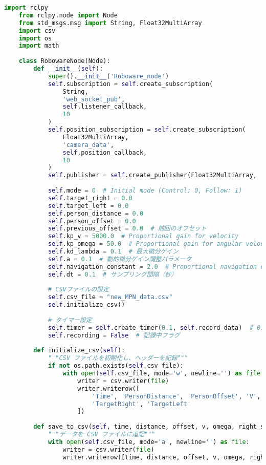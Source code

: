 \begin{lstlisting}[language=Python, caption=Roboware\_node.py]
    import rclpy
    from rclpy.node import Node
    from std_msgs.msg import String, Float32MultiArray
    import csv
    import os
    import math
    
    class RobowareNode(Node):
        def __init__(self):
            super().__init__('Roboware_node')
            self.subscription = self.create_subscription(
                String,
                'web_socket_pub',
                self.listener_callback,
                10
            )
            self.position_subscription = self.create_subscription(
                Float32MultiArray,
                'camera_data',
                self.position_callback,
                10
            )
            self.publisher = self.create_publisher(Float32MultiArray, 'wheel_targets', 10)
    
            self.mode = 0  # Initial mode (Control: 0, Follow: 1)
            self.target_right = 0.0
            self.target_left = 0.0
            self.person_distance = 0.0
            self.person_offset = 0.0
            self.previous_offset = 0.0  # 前回のオフセット
            self.kp_v = 5000.0  # Proportional gain for velocity
            self.kp_omega = 50.0  # Proportional gain for angular velocity
            self.kd_lambda = 0.1  # 最大微分ゲイン
            self.a = 0.1  # 動的微分ゲイン調整パラメータ
            self.navigation_constant = 2.0  # Proportional navigation constant (N)
            self.dt = 0.1  # サンプリング間隔（秒）
    
            # CSVファイルの設定
            self.csv_file = "new_MPN_data.csv"
            self.initialize_csv()
    
            # タイマー設定
            self.timer = self.create_timer(0.1, self.record_data)  # 0.1 秒ごとに実行
            self.recording = False  # 記録中フラグ
    
        def initialize_csv(self):
            """CSV ファイルを初期化し、ヘッダーを記録"""
            if not os.path.exists(self.csv_file):
                with open(self.csv_file, mode='w', newline='') as file:
                    writer = csv.writer(file)
                    writer.writerow([
                        'Time', 'PersonDistance', 'PersonOffset', 'V', 'Omega', 
                        'TargetRight', 'TargetLeft'
                    ])
    
        def save_to_csv(self, time, distance, offset, v, omega, right_speed, left_speed):
            """データを CSV ファイルに追記"""
            with open(self.csv_file, mode='a', newline='') as file:
                writer = csv.writer(file)
                writer.writerow([time, distance, offset, v, omega, right_speed, left_speed])
    

\end{lstlisting}
